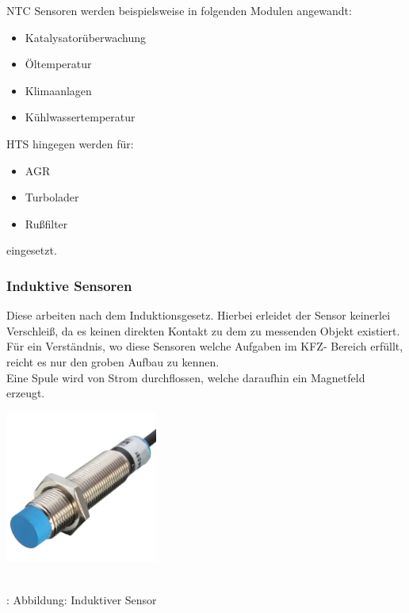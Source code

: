 \documentclass{article}
\begin{document}
				\begin{flushleft}
					
					NTC Sensoren werden beispielsweise in folgenden Modulen angewandt:
					
					\begin{itemize}
						\item Katalysatorüberwachung
						\item Öltemperatur
						\item Klimaanlagen
						\item Kühlwassertemperatur 	
					\end{itemize}
					
					HTS hingegen werden für:

					\begin{itemize}
						\item AGR
						\item Turbolader
						\item Rußfilter 
					\end{itemize}
					eingesetzt.

				\end{flushleft}
		
			\subsubsection{Induktive Sensoren}
				
				\begin{flushleft}
					
					Diese arbeiten nach dem Induktionsgesetz. 
					Hierbei erleidet der Sensor keinerlei Verschleiß, da es keinen direkten Kontakt zu dem zu messenden Objekt existiert.\\
					Für ein Verständnis, wo diese Sensoren welche Aufgaben im KFZ- Bereich erfüllt, reicht es nur den groben Aufbau zu kennen.\\
					Eine Spule wird von Strom durchflossen, welche daraufhin ein Magnetfeld erzeugt.\\	
			
				\end{flushleft}		
			
				\begin{center}
					\includegraphics[width=5cm, height=5cm] {Images/Kapitel5/induktiv.png}
					\caption{\\\cite{TS07}: Abbildung: Induktiver Sensor}
				\end{center}
			
\end{document}
